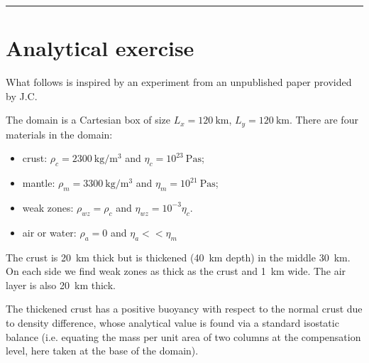 \par\noindent\rule{\textwidth}{0.4pt}



\section*{Analytical exercise}

What follows is inspired by an experiment from an unpublished paper provided by J.C.

The domain is a Cartesian box of size $L_x=120~\si{\km}$, $L_y=120~\si{\km}$.
There are four materials in the domain:
\begin{itemize}
\item crust: $\rho_{c}=2300~\si{\kg\per\cubic\meter}$ and $\eta_{c}=10^{23}~\si{\pascal\second}$;
\item mantle: $\rho_{m}=3300~\si{\kg\per\cubic\meter}$ and $\eta_{m}=10^{21}~\si{\pascal\second}$;
\item weak zones: $\rho_{wz}=\rho_{c}$ and $\eta_{wz}=10^{-3}\eta_{c}$.
\item air or water: $\rho_a=0$ and $\eta_a << \eta_m$
\end{itemize}

The crust is 20~\si{\km} thick but is thickened (40~\si{\km} depth) in the middle 30~\si{\km}.
On each side we find weak zones as thick as the crust and 1~\si{\km} wide. 
The air layer is also 20~\si{\km} thick.


The thickened crust has a positive buoyancy with respect to the normal crust due
to density difference, whose analytical value is found via a standard isostatic balance (i.e.
equating the mass per unit area of two columns at the compensation level, here taken at
the base of the domain).

